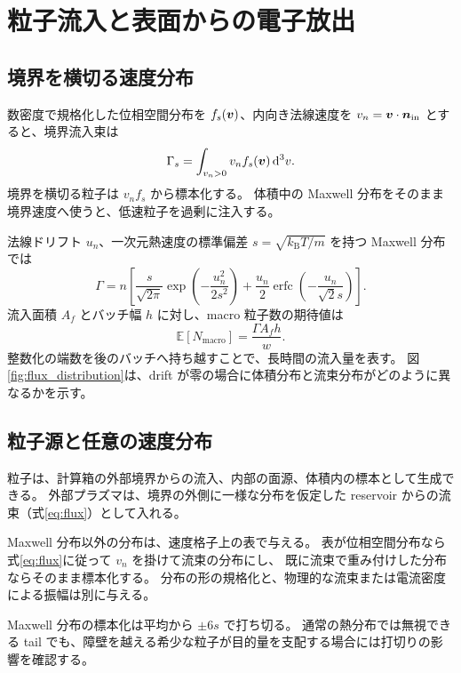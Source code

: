 \chapter{粒子流入と表面からの電子放出}
\label{ch:sources}

\section{境界を横切る速度分布}
数密度で規格化した位相空間分布を $f_s(\bm{v})$、内向き法線速度を
$v_n=\bm{v}\cdot\bm{n}_{\mathrm{in}}$ とすると、境界流入束は
\begin{equation}
 \Gamma_s=\int_{v_n>0}v_n f_s(\bm{v})\mathop{}\!\mathrm{d}^3v.
 \label{eq:flux}
\end{equation}
境界を横切る粒子は $v_n f_s$ から標本化する。
体積中の Maxwell 分布をそのまま境界速度へ使うと、低速粒子を過剰に注入する。

法線ドリフト $u_n$、一次元熱速度の標準偏差 $s=\sqrt{k_{\mathrm B}T/m}$ を持つ Maxwell 分布では
\begin{equation}
 \Gamma=n\left[
 \frac{s}{\sqrt{2\pi}}\exp\!\left(-\frac{u_n^2}{2s^2}\right)
 +\frac{u_n}{2}\operatorname{erfc}\!\left(-\frac{u_n}{\sqrt2 s}\right)
 \right].
\end{equation}
流入面積 $A_f$ とバッチ幅 $h$ に対し、macro 粒子数の期待値は
\begin{equation}
 \mathbb E[N_{\mathrm{macro}}]=\frac{\Gamma A_f h}{w}.
\end{equation}
整数化の端数を後のバッチへ持ち越すことで、長時間の流入量を表す。
図\ref{fig:flux_distribution}は、drift が零の場合に体積分布と流束分布がどのように異なるかを示す。


\section{粒子源と任意の速度分布}
粒子は、計算箱の外部境界からの流入、内部の面源、体積内の標本として生成できる。
外部プラズマは、境界の外側に一様な分布を仮定した reservoir からの流束（式\eqref{eq:flux}）として入れる。

Maxwell 分布以外の分布は、速度格子上の表で与える。
表が位相空間分布なら式\eqref{eq:flux}に従って $v_n$ を掛けて流束の分布にし、
既に流束で重み付けした分布ならそのまま標本化する。
分布の形の規格化と、物理的な流束または電流密度による振幅は別に与える。

Maxwell 分布の標本化は平均から $\pm6s$ で打ち切る。
通常の熱分布では無視できる tail でも、障壁を越える希少な粒子が目的量を支配する場合には打切りの影響を確認する。

